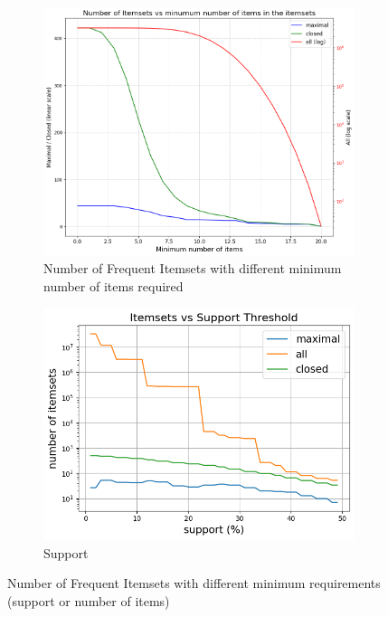 \documentclass[a4paper,11pt]{article}
\begin{document}
\begin{figure}
\centering
\begin{subfigure}{0.49\linewidth}
    \includegraphics[width=\linewidth]{figures/pattern_mining/output.png}
\caption{Number of Frequent Itemsets with different minimum number of items required}
\label{fig:p}
\end{subfigure}
\begin{subfigure}{0.5\linewidth}
    \includegraphics[width=\linewidth]{figures/pattern_mining/support.png}
\caption{Support}
\label{fig:sup}
\end{subfigure}
\caption{Number of Frequent Itemsets with different minimum requirements (support or number of items)}
\end{figure}
\end{document}
